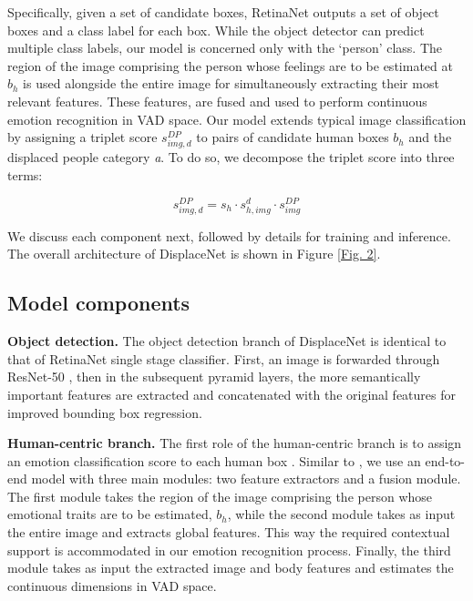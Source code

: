 \documentclass[10pt,twocolumn,letterpaper]{article}
\begin{document}
Specifically, given a set of candidate boxes, RetinaNet outputs a set of object boxes and a class label for each box. While the object detector can predict multiple class labels, our model is concerned only with the `person' class. The region of the image comprising the person whose feelings are to be estimated at $b_h$ is used alongside the entire image for simultaneously extracting their most relevant features. These features, are fused and used to perform continuous emotion recognition in VAD space. Our model extends typical image classification by assigning a triplet score $s_{img,d}^{DP}$  to pairs of candidate human boxes $b_h$ and the displaced people category \textit{a}. To do so, we decompose the triplet score into three terms:

\begin{equation} \label{eq:1}
s_{img,d}^{DP} = s_h  \cdot s_{h,img}^{d}  \cdot s_{img}^{DP}
\end{equation}


\noindent
We discuss each component next, followed by details for training and inference. The overall architecture of DisplaceNet is shown in
Figure \ref{Fig. 2}.


\subsection{Model components}

\noindent
\textbf{Object detection.} The object detection branch of DisplaceNet is identical to that of RetinaNet \cite{lin2018focal} single stage classifier. First, an image is forwarded through ResNet-50 \cite{he2016deep}, then in the subsequent pyramid layers, the more semantically important features are extracted and concatenated with the original features for improved bounding box regression. 

\noindent
\textbf{Human-centric branch.} The first role of the human-centric branch is to assign an emotion classification score to each human box . Similar to \cite{kosti2017emotion}, we use an end-to-end model with three main modules: two feature extractors and a fusion module. The first module takes the region of the image comprising the person whose emotional traits are to be estimated, $b_h$, while the second module takes as input the entire image and extracts global features. This way the required contextual support is accommodated in our emotion recognition process. Finally, the third module takes as input the extracted image and body features and estimates the continuous dimensions in VAD space. 
\end{document}
